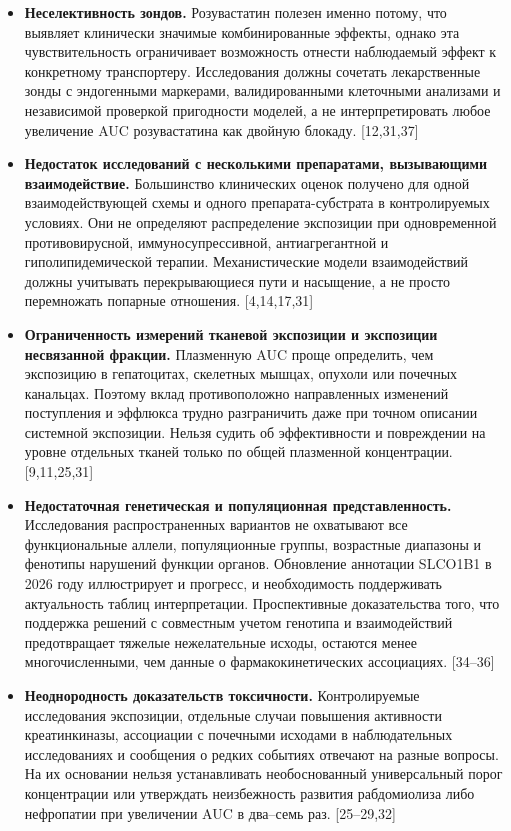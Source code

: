 \documentclass[11pt]{article}
\begin{document}
\begin{itemize}
\item \textbf{Неселективность зондов.} Розувастатин полезен именно потому, что выявляет клинически значимые комбинированные эффекты, однако эта чувствительность ограничивает возможность отнести наблюдаемый эффект к конкретному транспортеру. Исследования должны сочетать лекарственные зонды с эндогенными маркерами, валидированными клеточными анализами и независимой проверкой пригодности моделей, а не интерпретировать любое увеличение AUC розувастатина как двойную блокаду. [12,31,37]
\item \textbf{Недостаток исследований с несколькими препаратами, вызывающими взаимодействие.} Большинство клинических оценок получено для одной взаимодействующей схемы и одного препарата-субстрата в контролируемых условиях. Они не определяют распределение экспозиции при одновременной противовирусной, иммуносупрессивной, антиагрегантной и гиполипидемической терапии. Механистические модели взаимодействий должны учитывать перекрывающиеся пути и насыщение, а не просто перемножать попарные отношения. [4,14,17,31]
\item \textbf{Ограниченность измерений тканевой экспозиции и экспозиции несвязанной фракции.} Плазменную AUC проще определить, чем экспозицию в гепатоцитах, скелетных мышцах, опухоли или почечных канальцах. Поэтому вклад противоположно направленных изменений поступления и эффлюкса трудно разграничить даже при точном описании системной экспозиции. Нельзя судить об эффективности и повреждении на уровне отдельных тканей только по общей плазменной концентрации. [9,11,25,31]
\item \textbf{Недостаточная генетическая и популяционная представленность.} Исследования распространенных вариантов не охватывают все функциональные аллели, популяционные группы, возрастные диапазоны и фенотипы нарушений функции органов. Обновление аннотации SLCO1B1 в 2026 году иллюстрирует и прогресс, и необходимость поддерживать актуальность таблиц интерпретации. Проспективные доказательства того, что поддержка решений с совместным учетом генотипа и взаимодействий предотвращает тяжелые нежелательные исходы, остаются менее многочисленными, чем данные о фармакокинетических ассоциациях. [34--36]
\item \textbf{Неоднородность доказательств токсичности.} Контролируемые исследования экспозиции, отдельные случаи повышения активности креатинкиназы, ассоциации с почечными исходами в наблюдательных исследованиях и сообщения о редких событиях отвечают на разные вопросы. На их основании нельзя устанавливать необоснованный универсальный порог концентрации или утверждать неизбежность развития рабдомиолиза либо нефропатии при увеличении AUC в два--семь раз. [25--29,32]

\end{itemize}
\end{document}
